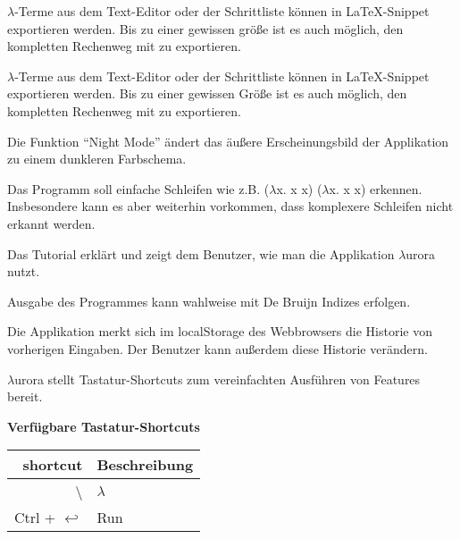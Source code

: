\documentclass[parskip=full,11pt,twoside]{scrartcl}
\begin{document}
$\lambda$-Terme aus dem Text-Editor oder der Schrittliste können in LaTeX-Snippet exportieren werden. Bis zu einer gewissen größe ist es auch möglich, den kompletten Rechenweg mit zu exportieren.


$\lambda$-Terme aus dem Text-Editor oder der Schrittliste können in LaTeX-Snippet exportieren werden. Bis zu einer gewissen Größe ist es auch möglich, den kompletten Rechenweg mit zu exportieren.


Die Funktion \enquote{Night Mode} ändert das äußere Erscheinungsbild der Applikation zu einem dunkleren Farbschema.

Das Programm soll einfache Schleifen wie z.B. ($\lambda$x. x x) ($\lambda$x. x x) erkennen. Insbesondere kann es aber weiterhin vorkommen, dass komplexere Schleifen nicht erkannt werden.

Das Tutorial erklärt und zeigt dem Benutzer, wie man die Applikation $\lambda$urora nutzt.

Ausgabe des Programmes kann wahlweise mit De Bruijn Indizes erfolgen.

Die Applikation merkt sich im localStorage des Webbrowsers die Historie von vorherigen Eingaben. Der Benutzer kann außerdem diese Historie verändern.

$\lambda$urora stellt Tastatur-Shortcuts zum vereinfachten Ausführen von Features bereit.

\textbf{Verfügbare Tastatur-Shortcuts}

\begin{tabular}{|r|l|}
    
    \hline 
    shortcut & Beschreibung \\ \hline
    \textbackslash & $\lambda$ \\ \hline
    Ctrl + $\hookleftarrow$ & Run \\ \hline
    
\end{tabular}
\end{document}
